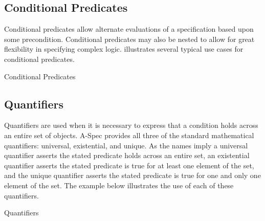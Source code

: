 \documentclass[letterpaper,10pt,draft]{book}
\begin{document}
\subsection{Conditional Predicates}
   \label{sect:CondPred}

Conditional predicates allow alternate evaluations of a specification based upon
some precondition.  Conditional predicates may also be nested to allow for great
flexibility in specifying complex logic.   illustrates several
typical use cases for conditional predicates.

\begin{example}
\begin{minipage}[t]{0.49\linewidth}
   
\end{minipage}
\begin{minipage}[t]{0.49\linewidth}
   \azbox
   
\end{minipage}

   \caption{Conditional Predicates}
   \label{ex:CondPred}
\end{example}

\subsection{Quantifiers}
   \label{sect:Quantifiers}

Quantifiers are used when it is necessary to express that a condition holds across
an entire set of objects.  A-Spec provides all three of the standard mathematical
quantifiers: universal, existential, and unique.  As the names imply a universal
quantifier asserts the stated predicate holds across an entire set, an existential
quantifier asserts the stated predicate is true for at least one element of the
set, and the unique quantifier asserts the stated predicate is true for one and
only one element of the set.  The example below illustrates the use of each of these
quantifiers.

\begin{example}
\begin{minipage}[t]{0.49\linewidth}
   
\end{minipage}
\begin{minipage}[t]{0.49\linewidth}
   \azbox
   
\end{minipage}

   \caption{Quantifiers}
   \label{ex:Quant}
\end{example}
\end{document}

